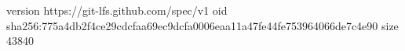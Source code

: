 version https://git-lfs.github.com/spec/v1
oid sha256:775a4db2f4ce29cdcfaa69ec9dcfa0006eaa11a47fe44fe753964066de7c4e90
size 43840
